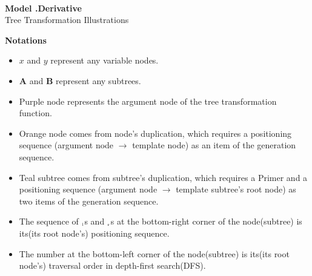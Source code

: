 \documentclass[UTF8,10pt]{ctexart}
\newcommand{\subtreeA}{\bf A}
\newcommand{\subtreeB}{\bf B}
\newcommand{\x}{$x$}
\newcommand{\y}{$y$}
\begin{document}
    \thispagestyle{empty}
    \ \\[80mm]
    \mbox{}\hfill{\Huge\bf Model .Derivative}\hfill\mbox{}\\[5mm]
    \mbox{}\hfill{\Large Tree Transformation Illustrations}\hfill\mbox{}

	\newpage

	{\noindent\Large\bf Notations}
	\begin{itemize}[leftmargin=*]
	\item {\x} and {\y} represent any variable nodes.
	\item {\subtreeA} and {\subtreeB} represent any subtrees.
	\item {\color{purple}Purple node} represents the argument node of the tree transformation function.
	\item {\color{orange}Orange node} comes from node's duplication, which requires a positioning sequence (argument node $\to$ template node) as an item of the generation sequence.
	\item {\color{teal}Teal subtree} comes from subtree's duplication, which requires a Primer and a positioning sequence (argument node $\to$ template subtree's root node) as two items of the generation sequence.
	\item The sequence of $_{\scriptscriptstyle\rm l}$s and $_{\scriptscriptstyle\rm r}$s at the bottom-right corner of the node(subtree) is its(its root node's) positioning sequence.
	\item The number at the bottom-left corner of the node(subtree) is its(its root node's) traversal order in depth-first search(DFS).
	\end{itemize}

	\newpage
\end{document}
